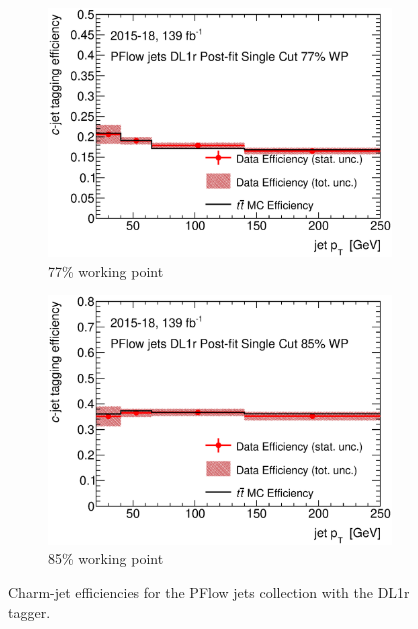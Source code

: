 \begin{figure}[H]
\begin{subfigure}[t]{.35\linewidth}
		\includegraphics[width=1\textwidth]{FTAG_plots/DL1rallPFlowDec/eff77.eps}
		\caption{77\% working point}
		\end{subfigure}
		\begin{subfigure}[t]{.35\linewidth}
		\includegraphics[width=1\textwidth]{FTAG_plots/DL1rallPFlowDec/eff85.eps}
		\caption{85\% working point}
		\end{subfigure}
		\caption{Charm-jet efficiencies for the PFlow jets collection with
	the DL1r tagger.} \label{fig:Dec_eff_PFlow_DL1r}
\end{figure}


